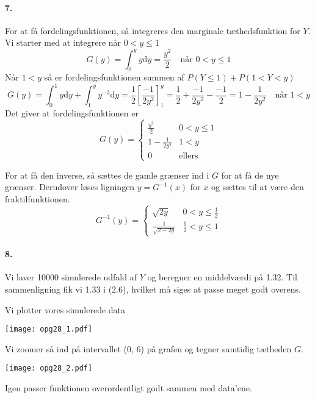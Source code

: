 \documentclass[12pt]{article}
\begin{document}
\paragraph{7.}
For at få fordelingsfunktionen, så integreres den marginale tæthedsfunktion for $Y$. 
Vi starter med at integrere når $0 < y \leq 1$
\[
    G(y) =
    \int_0^y y \mathrm{d}y = \frac{y^2}{2} \quad \text{når } 0 < y \leq 1
\]
Når $1 < y$ så er fordelingsfunktionen summen af $P(Y \leq 1) + P(1 < Y < y)$
\[
    G(y) =
    \int_0^1 y \mathrm{d}y + \int_1^y y^{-3} \mathrm{d}y = \frac{1}{2}\left[ \frac{-1}{2y^2} \right]_1^y = \frac{1}{2} + \frac{-1}{2y^2} - \frac{-1}{2} = 1-\frac{1}{2y^2}
    \quad \text{når } 1 < y
\]
Det giver at fordelingsfunktionen er
\[
    G(y) =
    \begin{cases}
        \frac{y^2}{2} & 0<y\leq 1\\
        1-\frac{1}{2y^2} & 1 < y \\
        0 &\text{ellers}
    \end{cases}
\]

For at få den inverse, så sættes de gamle grænser ind i $G$ for at få de nye grænser. Derudover løses ligningen $y = G^{-1}(x)$ for $x$ og sættes til at være den fraktilfunktionen.
\[
    G^{-1}(y) =
    \begin{cases}
        \sqrt{2y} & 0 < y \leq \frac{1}{2} \\
        \frac{1}{\sqrt{2-2y}} & \frac{1}{2} < y \leq 1
    \end{cases}
\]

\paragraph{8.}
Vi laver 10000 simulerede udfald af $Y$ og beregner en middelværdi på 1.32. Til sammenligning fik vi 1.33 i (2.6), hvilket må siges at passe meget godt overens.

Vi plotter vores simulerede data
\begin{center}
  \texttt{[image: opg28\_1.pdf]}
\end{center}

Vi zoomer så ind på intervallet (0, 6) på grafen og tegner samtidig tætheden $G$.
\begin{center}
  \texttt{[image: opg28\_2.pdf]}
\end{center}

Igen passer funktionen overordentligt godt sammen med data'ene.
\end{document}
